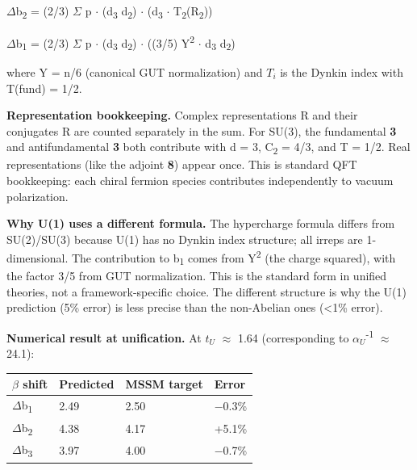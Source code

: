 \documentclass[11pt,a4paper]{article}
\theoremstyle{remark}
\begin{document}
\ensuremath{\Delta}b\textsubscript{2} = (2/3) \ensuremath{\Sigma} p \ensuremath{\cdot} (d\textsubscript{3} d\textsubscript{2}) \ensuremath{\cdot} (d\textsubscript{3} \ensuremath{\cdot} T\textsubscript{2}(R\textsubscript{2}))

\ensuremath{\Delta}b\textsubscript{1} = (2/3) \ensuremath{\Sigma} p \ensuremath{\cdot} (d\textsubscript{3} d\textsubscript{2}) \ensuremath{\cdot} ((3/5) Y\textsuperscript{2} \ensuremath{\cdot} d\textsubscript{3} d\textsubscript{2})

where Y = n/6 (canonical GUT normalization) and \(T_i\) is the Dynkin index with T(fund) = 1/2.

\textbf{Representation bookkeeping.} Complex representations R and their conjugates R are counted separately in the sum. For SU(3), the fundamental \textbf{3} and antifundamental \textbf{3} both contribute with d = 3, C\textsubscript{2} = 4/3, and T = 1/2. Real representations (like the adjoint \textbf{8}) appear once. This is standard QFT bookkeeping: each chiral fermion species contributes independently to vacuum polarization.

\textbf{Why U(1) uses a different formula.} The hypercharge formula differs from SU(2)/SU(3) because U(1) has no Dynkin index structure; all irreps are 1-dimensional. The contribution to b\textsubscript{1} comes from Y\textsuperscript{2} (the charge squared), with the factor 3/5 from GUT normalization. This is the standard form in unified theories, not a framework-specific choice. The different structure is why the U(1) prediction (5\% error) is less precise than the non-Abelian ones (\textless1\% error).

\textbf{Numerical result at unification.} At \(t_U\) \ensuremath{\approx} 1.64 (corresponding to \(\ensuremath{\alpha}_U\)\textsuperscript{-1} \ensuremath{\approx} 24.1):

{\def\LTcaptype{none} %
\begin{longtable}[]{@{}llll@{}}
\toprule\noalign{}
\ensuremath{\beta} shift & Predicted & MSSM target & Error \\
\midrule\noalign{}
\endhead
\bottomrule\noalign{}
\endlastfoot
\ensuremath{\Delta}b\textsubscript{1} & 2.49 & 2.50 & \ensuremath{-}0.3\% \\
\ensuremath{\Delta}b\textsubscript{2} & 4.38 & 4.17 & +5.1\% \\
\ensuremath{\Delta}b\textsubscript{3} & 3.97 & 4.00 & \ensuremath{-}0.7\% \\
\end{longtable}
}
\end{document}
